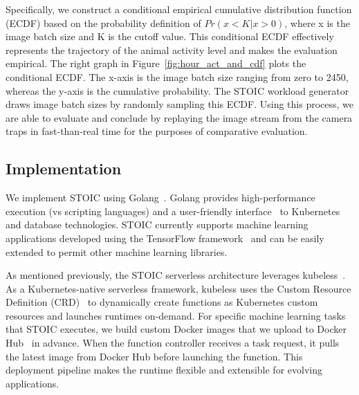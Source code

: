 Specifically, we construct a conditional empirical cumulative distribution function (ECDF) based on the probability definition of  $Pr(x < K | x > 0)$, where x is the image batch size and K is the cutoff value. This conditional ECDF effectively represents the trajectory of the animal activity level and makes the evaluation empirical. The right graph in Figure~\ref{fig:hour_act_and_cdf} plots the conditional ECDF. 
The x-axis is the image batch size ranging from zero to 2450, whereas the y-axis is the cumulative probability. The STOIC workload generator draws image batch sizes by
randomly sampling this ECDF.
Using this process, we are able to evaluate and conclude by replaying the image stream from the camera traps in fast-than-real time for the purposes of comparative evaluation.




 \subsection{Implementation}

We implement STOIC using Golang~\cite{ref:golang}. Golang provides high-performance execution (vs scripting languages) and a user-friendly interface~\cite{ref:client-go} to Kubernetes and database technologies. STOIC currently supports machine learning applications developed using the TensorFlow framework~\cite{ref:tensorflow} and can be easily extended to permit other machine learning libraries.
 
As mentioned previously, the STOIC serverless architecture leverages kubeless~\cite{ref:kubeless}. As a Kubernetes-native serverless framework, kubeless uses the Custom Resource Definition (CRD)~\cite{ref:crd} to dynamically create functions as Kubernetes custom resources and launches runtimes on-demand. For specific machine learning tasks that STOIC executes, we build custom Docker images that we upload to Docker Hub~\cite{ref:dockerhub} in advance. When the function controller receives a task request, it pulls the latest image from Docker Hub before launching the function. This deployment pipeline makes the runtime flexible and extensible for evolving applications. 

